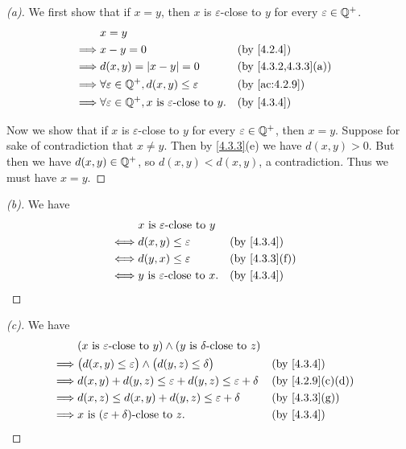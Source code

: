 \begin{proof}[(a)]
  We first show that if \(x = y\), then \(x\) is \(\varepsilon\)-close to \(y\) for every \(\varepsilon \in \mathbb{Q}^+\).
  \begin{align*}
             & x = y                                                                                            \\
    \implies & x - y = 0                                                               &  & \by{4.2.4}          \\
    \implies & d(x, y) = \abs{x - y} = 0                                               &  & \by{4.3.2,4.3.3}[a] \\
    \implies & \forall \varepsilon \in \Q^+, d(x, y) \leq \varepsilon                  &  & \by{ac:4.2.9}       \\
    \implies & \forall \varepsilon \in \Q^+, x \text{ is \(\varepsilon\)-close to } y. &  & \by{4.3.4}
  \end{align*}

  Now we show that if \(x\) is \(\varepsilon\)-close to \(y\) for every \(\varepsilon \in \mathbb{Q}^+\), then \(x = y\).
  Suppose for sake of contradiction that \(x \neq y\).
  Then by \cref{4.3.3}(e) we have \(d(x, y) > 0\).
  But then we have \(d(x, y) \in \mathbb{Q}^+\), so \(d(x, y) < d(x, y)\), a contradiction.
  Thus we must have \(x = y\).
\end{proof}

\begin{proof}[(b)]
  We have
  \begin{align*}
         & x \text{ is \(\varepsilon\)-close to } y                     \\
    \iff & d(x, y) \leq \varepsilon                  &  & \by{4.3.4}    \\
    \iff & d(y, x) \leq \varepsilon                  &  & \by{4.3.3}[f] \\
    \iff & y \text{ is \(\varepsilon\)-close to } x. &  & \by{4.3.4}
  \end{align*}
\end{proof}

\begin{proof}[(c)]
  We have
  \begin{align*}
             & (x \text{ is \(\varepsilon\)-close to } y) \land (y \text{ is \(\delta\)-close to } z)                      \\
    \implies & \big(d(x, y) \leq \varepsilon\big) \land \big(d(y, z) \leq \delta\big)                 &  & \by{4.3.4}      \\
    \implies & d(x, y) + d(y, z) \leq \varepsilon + d(y, z) \leq \varepsilon + \delta                 &  & \by{4.2.9}[c,d] \\
    \implies & d(x, z) \leq d(x, y) + d(y, z) \leq \varepsilon + \delta                               &  & \by{4.3.3}[g]   \\
    \implies & x \text{ is \((\varepsilon + \delta)\)-close to } z.                                   &  & \by{4.3.4}
  \end{align*}
\end{proof}

